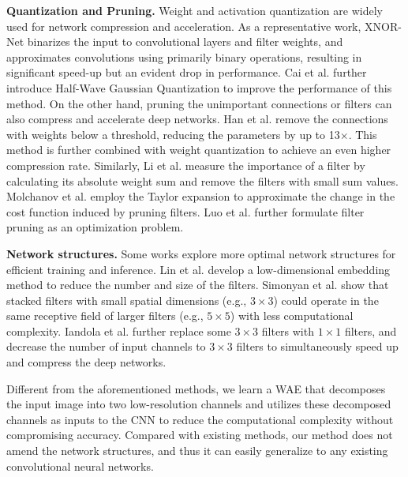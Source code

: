 \documentclass[letterpaper]{article} %
\begin{document}
\noindent\textbf{Quantization and Pruning. }Weight and activation quantization are widely used for network compression and acceleration. As a representative work, XNOR-Net \cite{rastegari2016xnor} binarizes the input to convolutional layers and filter weights, and approximates convolutions using primarily binary operations, resulting in significant speed-up but an evident drop in performance. Cai et al. \cite{cai2017deep} further introduce Half-Wave Gaussian Quantization to improve the performance of this method. On the other hand, pruning the unimportant connections or filters can also compress and accelerate deep networks. Han et al. \cite{han2015deep} remove the connections with weights below a threshold, reducing the parameters by up to 13$\times$. This method is further combined with weight quantization to achieve an even higher compression rate. Similarly, Li et al. \cite{li2016pruning} measure the importance of a filter by calculating its absolute weight sum and remove the filters with small sum values. Molchanov et al. \cite{molchanov2016pruning} employ the Taylor expansion to approximate the change in the cost function induced by pruning filters. Luo et al. \cite{luo2017thinet} further formulate filter pruning as an optimization problem.


\noindent\textbf{Network structures. }Some works explore more optimal network structures for efficient training and inference.  Lin et al. \cite{lin2013network} develop a low-dimensional embedding method to reduce the number and size of the filters. Simonyan et al. \cite{simonyan2014very} show that stacked filters with small spatial dimensions (e.g., $3 \times 3$) could operate in the same receptive field of larger filters (e.g., $5 \times 5$) with less computational complexity. Iandola et al. \cite{iandola2016squeezenet} further replace some $3 \times 3$ filters with $1 \times 1$ filters, and decrease the number of input channels to $3 \times 3$ filters to simultaneously speed up and compress the deep networks.

Different from the aforementioned methods, we learn a WAE that decomposes the input image into two low-resolution channels and utilizes these decomposed channels as inputs to the CNN to reduce the computational complexity without compromising accuracy. Compared with existing methods, our method does not amend the network structures, and thus it can easily generalize to any existing convolutional neural networks.
\end{document}
